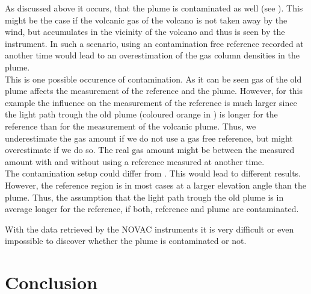 \documentclass  [
  paper    = a4,
  BCOR     = 10mm,
  twoside,
  fontsize = 12pt,
  fleqn,
  toc      = bibnumbered,
  toc      = listofnumbered,
  numbers  = noendperiod,
  headings = normal,
  listof   = leveldown,
  version  = 3.03
]                                       {scrreprt}
\begin{document}
	 As discussed above it occurs, that the plume is contaminated as well (see ). This might be the case if the volcanic gas of the volcano is not taken away by the wind, but accumulates in the vicinity of the volcano and thus is seen by the instrument. In such a scenario, using an contamination free reference recorded at another time would lead to an overestimation of the gas column densities in the plume.\\
	 This is one possible occurence of contamination. As it can be seen gas of the old plume affects the measurement of the reference and the plume. However, for this example the influence on the measurement of the reference is much larger since the light path trough the old plume (coloured orange in ) is longer for the reference than for the measurement of the volcanic plume. Thus, we underestimate the gas amount if we do not use a gas free reference, but might overestimate if we do so.
	 The real gas amount might be between the measured amount with and without using a reference measured at another time.\\
	 The contamination setup could differ from . This would lead to different results. However, the reference region is in most cases at a larger elevation angle than the plume. Thus, the assumption that the light path trough the old plume is in average longer for the reference, if both, reference and plume are contaminated.
	 
	  With the data retrieved by the NOVAC instruments it is very difficult or even impossible to discover whether the plume is contaminated or not. \\
%	


	\chapter{Conclusion}
	
\end{document}
